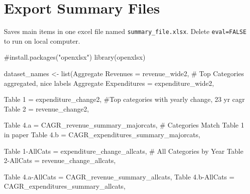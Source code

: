 \documentclass[
  letterpaper,
  DIV=11,
  numbers=noendperiod]{scrreport}
\newenvironment{Shaded}{\begin{snugshade}}{\end{snugshade}}
\newcommand{\CommentTok}[1]{\textcolor[rgb]{0.37,0.37,0.37}{#1}}
\newcommand{\FunctionTok}[1]{\textcolor[rgb]{0.28,0.35,0.67}{#1}}
\newcommand{\NormalTok}[1]{\textcolor[rgb]{0.00,0.23,0.31}{#1}}
\newcommand{\OtherTok}[1]{\textcolor[rgb]{0.00,0.23,0.31}{#1}}
\newcommand{\StringTok}[1]{\textcolor[rgb]{0.13,0.47,0.30}{#1}}
\begin{document}
\hypertarget{export-summary-files}{%
\section{Export Summary Files}\label{export-summary-files}}

Saves main items in one excel file named \texttt{summary\_file.xlsx}.
Delete \texttt{eval=FALSE} to run on local computer.

\begin{Shaded}
\begin{Highlighting}[]
\CommentTok{\#install.packages("openxlsx")}
\FunctionTok{library}\NormalTok{(openxlsx)}

\NormalTok{dataset\_names }\OtherTok{\textless{}{-}} \FunctionTok{list}\NormalTok{(}\StringTok{\textquotesingle{}Aggregate Revenues\textquotesingle{}} \OtherTok{=}\NormalTok{ revenue\_wide2, }\CommentTok{\# Top Categories aggregated, nice labels}
                      \StringTok{\textquotesingle{}Aggregate Expenditures\textquotesingle{}} \OtherTok{=}\NormalTok{ expenditure\_wide2, }

                      
                      \StringTok{\textquotesingle{}Table 1\textquotesingle{}} \OtherTok{=}\NormalTok{ expenditure\_change2, }\CommentTok{\#Top categories with yearly change, 23 yr cagr}
                      \StringTok{\textquotesingle{}Table 2\textquotesingle{}} \OtherTok{=}\NormalTok{ revenue\_change2,}
                      
                      \StringTok{\textquotesingle{}Table 4.a\textquotesingle{}} \OtherTok{=}\NormalTok{ CAGR\_revenue\_summary\_majorcats, }\CommentTok{\# Categories Match Table 1 in paper}
                      \StringTok{\textquotesingle{}Table 4.b\textquotesingle{}} \OtherTok{=}\NormalTok{ CAGR\_expenditures\_summary\_majorcats, }
                                            
                      \StringTok{\textquotesingle{}Table 1{-}AllCats\textquotesingle{}} \OtherTok{=}\NormalTok{ expenditure\_change\_allcats,  }\CommentTok{\# All Categories by Year}
                      \StringTok{\textquotesingle{}Table 2{-}AllCats\textquotesingle{}} \OtherTok{=}\NormalTok{ revenue\_change\_allcats,}
                      
                      \StringTok{\textquotesingle{}Table 4.a{-}AllCats\textquotesingle{}} \OtherTok{=}\NormalTok{ CAGR\_revenue\_summary\_allcats, }
                      \StringTok{\textquotesingle{}Table 4.b{-}AllCats\textquotesingle{}} \OtherTok{=}\NormalTok{ CAGR\_expenditures\_summary\_allcats, }
                      

\end{Highlighting}
\end{Shaded}
\end{document}
